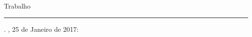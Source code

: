 %
% 
%
\begin{folhadeaprovacao}

  \begin{center}
    {\ABNTEXchapterfont\large\imprimirautor}

    \vspace*{\fill}\vspace*{\fill}
    \begin{center}
      \ABNTEXchapterfont\bfseries\Large\imprimirtitulo
    \end{center}
    \vspace*{\fill}

    \hspace{.45\textwidth}
    \begin{minipage}{.5\textwidth}
        \imprimirpreambulo
    \end{minipage}%
    \vspace*{\fill}
   \end{center}

   Trabalho \rule{2.5cm}{.2pt}. \imprimirlocal, 25 de Janeiro de 2017:


   \begin{center}
    \vspace*{0.5cm}
    {\large\imprimirlocal}
    \par
    {\large\imprimirdata}
    \vspace*{1cm}
  \end{center}

\end{folhadeaprovacao}
